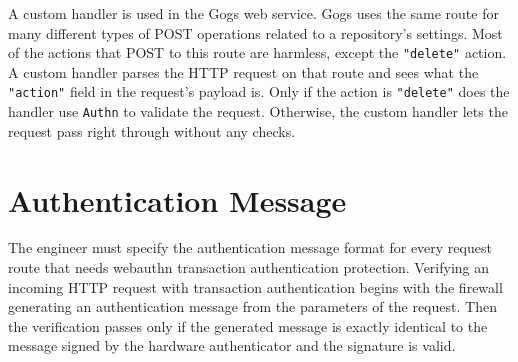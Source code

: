 A custom handler is used in the Gogs web service. Gogs uses the same route for many different types of POST operations related to a repository's settings. Most of the actions that POST to this route are harmless, except the \lstinline{"delete"} action. A custom handler parses the HTTP request on that route and sees what the \lstinline{"action"} field in the request's payload is. Only if the action is \lstinline{"delete"} does the handler use \lstinline{Authn} to validate the request. Otherwise, the custom handler lets the request pass right through without any checks.









\section{Authentication Message}\label{Sec:AuthenticationMessage}

The engineer must specify the authentication message format for every request route that needs webauthn transaction authentication protection. Verifying an incoming HTTP request with transaction authentication begins with the firewall generating an authentication message from the parameters of the request. Then the verification passes only if the generated message is exactly identical to the message signed by the hardware authenticator and the signature is valid.

